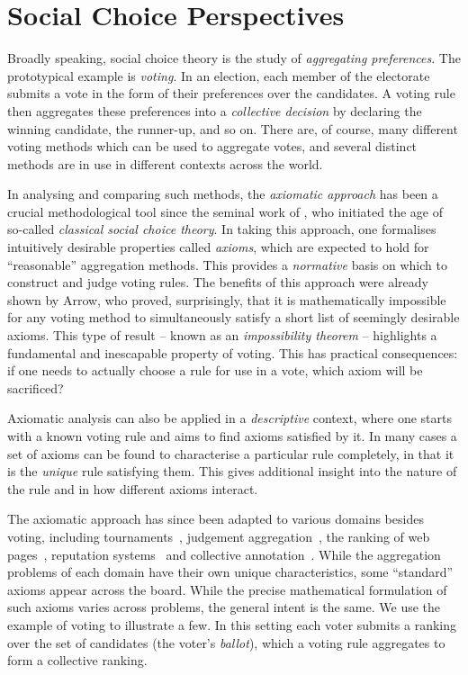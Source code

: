 \section{Social Choice Perspectives}
\label{intro_sec_social_choice_perspectives}

Broadly speaking, social choice theory is the study of \emph{aggregating
preferences}. The prototypical example is \emph{voting}. In an election, each
member of the electorate submits a vote in the form of their preferences over
the candidates. A voting rule then aggregates these preferences into a
\emph{collective decision} by declaring the winning candidate, the runner-up,
and so on. There are, of course, many different voting methods which can be
used to aggregate votes, and several distinct methods are in use in different
contexts across the world.

In analysing and comparing such methods, the \emph{axiomatic approach} has been
a crucial methodological tool since the seminal work of \textcite{arrow1952},
who initiated the age of so-called \emph{classical social choice theory}. In
taking this approach, one formalises intuitively desirable properties called
\emph{axioms}, which are expected to hold for ``reasonable'' aggregation
methods. This provides a \emph{normative} basis on which to construct and judge
voting rules. The benefits of this approach were already shown by Arrow, who
proved, surprisingly, that it is mathematically impossible for any voting
method to simultaneously satisfy a short list of seemingly desirable axioms.
This type of result -- known as an \emph{impossibility theorem} -- highlights a
fundamental and inescapable property of voting.\footnotemark{} This has
practical consequences: if one needs to actually choose a rule for use in a
vote, which axiom will be sacrificed?


Axiomatic analysis can also be applied in a \emph{descriptive} context, where
one starts with a known voting rule and aims to find axioms satisfied by it. In
many cases a set of axioms can be found to characterise a particular rule
completely, in that it is the \emph{unique} rule satisfying them. This gives
additional insight into the nature of the rule and in how different axioms
interact.

The axiomatic approach has since been adapted to various domains besides
voting, including tournaments~\cite{brandt2016a}, judgement
aggregation~\cite{endriss2016ja}, the ranking of web
pages~\cite{altman2005ranking}, reputation systems~\cite{tennenholtz2004} and
collective annotation~\cite{kruger2014}. While the aggregation problems of each
domain have their own unique characteristics, some ``standard'' axioms appear
across the board. While the precise mathematical formulation of such axioms
varies across problems, the general intent is the same. We use the example of
voting to illustrate a few. In this setting each voter submits a ranking over
the set of candidates (the voter's \emph{ballot}), which a voting rule
aggregates to form a collective ranking.

